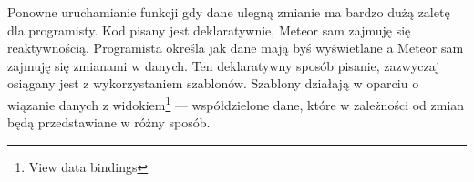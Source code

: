 Ponowne uruchamianie funkcji gdy dane ulegną zmianie ma bardzo dużą zaletę dla programisty. Kod pisany jest deklaratywnie, Meteor sam zajmuję się reaktywnością. Programista określa jak dane mają byś wyświetlane a Meteor sam zajmuję się zmianami w danych. Ten deklaratywny sposób pisanie, zazwyczaj osiągany jest z wykorzystaniem szablonów. Szablony działają w oparciu o wiązanie danych z widokiem\footnote{View data bindings} --- współdzielone dane, które w zależności od zmian będą przedstawiane w różny sposób\cite{strack15}. 


